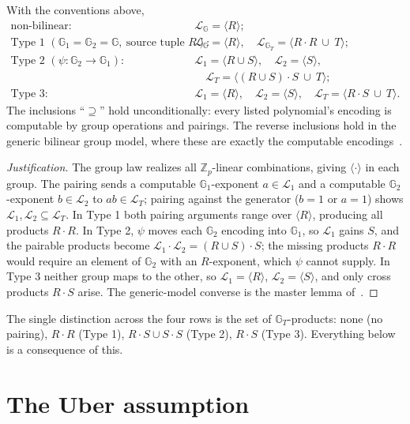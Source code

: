 \documentclass{aicr-solution}
\newcommand{\G}{\mathbb{G}}
\newcommand{\Gone}{\mathbb{G}_1}
\newcommand{\Gtwo}{\mathbb{G}_2}
\newcommand{\GT}{\mathbb{G}_T}
\newcommand{\Zp}{\mathbb{Z}_p}
\newcommand{\LL}{\mathcal{L}}
\newcommand{\Span}[1]{\langle #1 \rangle} %
\begin{document}
\begin{lemma}
\label{lem:comp}
With the conventions above,
\[
\begin{aligned}
  \text{non-bilinear:}\quad & \LL_{\G}=\Span{R};\\[2pt]
  \text{Type 1 } (\Gone=\Gtwo=\G,\ \text{source tuple }R):\quad
      & \LL_{\G}=\Span{R},\quad \LL_{\GT}=\Span{R\cdot R\ \cup\ T};\\[2pt]
  \text{Type 2 } (\psi\colon\Gtwo\to\Gone):\quad
      & \LL_{1}=\Span{R\cup S},\quad \LL_{2}=\Span{S},\\
      &\quad \LL_{T}=\Span{(R\cup S)\cdot S\ \cup\ T};\\[2pt]
  \text{Type 3:}\quad
      & \LL_{1}=\Span{R},\quad \LL_{2}=\Span{S},\quad
        \LL_{T}=\Span{R\cdot S\ \cup\ T}.
\end{aligned}
\]
The inclusions ``$\supseteq$'' hold unconditionally: every listed polynomial's encoding is
computable by group operations and pairings. The reverse inclusions hold in the generic
bilinear group model, where these are exactly the computable encodings~\cite{BBG05,Boyen08}.
\end{lemma}

\begin{proof}[Justification]
The group law realizes all $\Zp$-linear combinations, giving $\Span{\cdot}$ in each group.
The pairing sends a computable $\Gone$-exponent $a\in\LL_1$ and a computable
$\Gtwo$-exponent $b\in\LL_2$ to $ab\in\LL_T$; pairing against the generator ($b=1$ or
$a=1$) shows $\LL_1,\LL_2\subseteq\LL_T$. In Type 1 both pairing arguments range over
$\Span{R}$, producing all products $R\cdot R$. In Type 2, $\psi$ moves each $\Gtwo$
encoding into $\Gone$, so $\LL_1$ gains $S$, and the pairable products become
$\LL_1\cdot\LL_2=(R\cup S)\cdot S$; the missing products $R\cdot R$ would require an
element of $\Gtwo$ with an $R$-exponent, which $\psi$ cannot supply. In Type 3 neither
group maps to the other, so $\LL_1=\Span{R}$, $\LL_2=\Span{S}$, and only cross products
$R\cdot S$ arise. The generic-model converse is the master lemma
of~\cite{BBG05,Boyen08}.
\end{proof}

The single distinction across the four rows is the set of $\GT$-products: none (no pairing),
$R\cdot R$ (Type 1), $R\cdot S\cup S\cdot S$ (Type 2), $R\cdot S$ (Type 3). Everything below
is a consequence of this.

\section{The Uber assumption}
\end{document}
